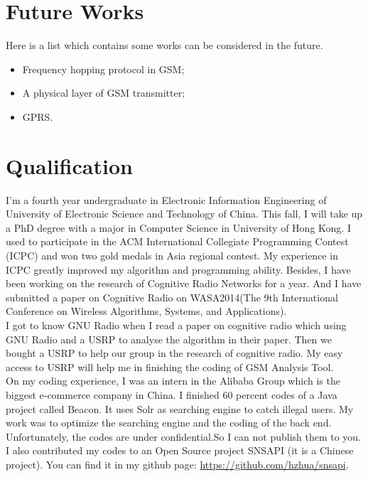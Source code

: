 \documentclass[a4paper,12pt,oneside]{article}
\begin{document}
\section{Future Works}
Here is a list which contains some works can be considered in the future.

\begin{itemize}
\item Frequency hopping protocol in GSM;
\item A physical layer of GSM transmitter;
\item GPRS.
\end{itemize}

\section{Qualification}
I'm a fourth year undergraduate in Electronic Information Engineering of University of Electronic Science and Technology of China. This fall, I will take up a PhD degree with a major in Computer Science in University of Hong Kong. I used to participate in the ACM International Collegiate Programming Contest (ICPC) and won two gold medals in Asia regional contest. My experience in ICPC greatly improved my algorithm and programming ability. Besides, I have been working on the research of Cognitive Radio Networks for a year. And I have submitted a paper on Cognitive Radio on WASA2014(The 9th International Conference on Wireless Algorithms, Systems, and Applications). \\

I got to know GNU Radio when I read a paper on cognitive radio which using GNU Radio and a USRP to analyse the algorithm in their paper. Then we bought a USRP to help our group in the research of cognitive radio. My easy access to USRP will help me in finishing the coding of GSM Analysis Tool.\\

On my coding experience, I was an intern in the Alibaba Group which is the biggest e-commerce company in China. I finished 60 percent codes of a Java project called Beacon. It uses Solr as searching engine to catch illegal users. My work was to optimize the searching engine and the coding of the back end. Unfortunately, the codes are under confidential.So I can not publish them to you. I also contributed my codes to an Open Source project SNSAPI (it is a Chinese project). You can find it in my github page: {\color{blue}\url{https://github.com/hzhua/snsapi}}.\\
\end{document}

